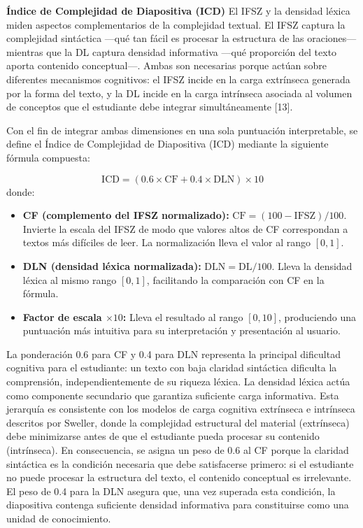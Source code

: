 \documentclass[11pt]{article}
\begin{document}
\textbf{Índice de Complejidad de Diapositiva (ICD)}
El IFSZ y la densidad léxica miden aspectos complementarios de la complejidad textual. El IFSZ captura la complejidad sintáctica —qué tan fácil es procesar la estructura de las oraciones— mientras que la DL captura densidad informativa —qué proporción del texto aporta contenido conceptual—. Ambas son necesarias porque actúan sobre diferentes mecanismos cognitivos: el IFSZ incide en la carga extrínseca generada por la forma del texto, y la DL incide en la carga intrínseca asociada al volumen de conceptos que el estudiante debe integrar simultáneamente [13].

Con el fin de integrar ambas dimensiones en una sola puntuación interpretable, se define el Índice de Complejidad de Diapositiva (ICD) mediante la siguiente fórmula compuesta:

\[
\mathrm{ICD} = (0.6 \times \mathrm{CF} + 0.4 \times \mathrm{DLN}) \times 10
\]
donde:
\begin{itemize}
    \item \textbf{CF (complemento del IFSZ normalizado):} $\mathrm{CF} = (100 - \mathrm{IFSZ}) / 100$. Invierte la escala del IFSZ de modo que valores altos de CF correspondan a textos más difíciles de leer. La normalización lleva el valor al rango $[0,1]$.
    \item \textbf{DLN (densidad léxica normalizada):} $\mathrm{DLN} = \mathrm{DL} / 100$. Lleva la densidad léxica al mismo rango $[0,1]$, facilitando la comparación con CF en la fórmula.
    \item \textbf{Factor de escala $\times 10$:} Lleva el resultado al rango $[0,10]$, produciendo una puntuación más intuitiva para su interpretación y presentación al usuario.
\end{itemize}
La ponderación 0.6 para CF y 0.4 para DLN representa la principal dificultad cognitiva para el estudiante: un texto con baja claridad sintáctica dificulta la comprensión, independientemente de su riqueza léxica. La densidad léxica actúa como componente secundario que garantiza suficiente carga informativa. Esta jerarquía es consistente con los modelos de carga cognitiva extrínseca e intrínseca descritos por Sweller, donde la complejidad estructural del material (extrínseca) debe minimizarse antes de que el estudiante pueda procesar su contenido (intrínseca). 
En consecuencia, se asigna un peso de 0.6 al CF porque la claridad sintáctica es la condición necesaria que debe satisfacerse primero: si el estudiante no puede procesar la estructura del texto, el contenido conceptual es irrelevante. El peso de 0.4 para la DLN asegura que, una vez superada esta condición, la diapositiva contenga suficiente densidad informativa para constituirse como una unidad de conocimiento.
\end{document}
